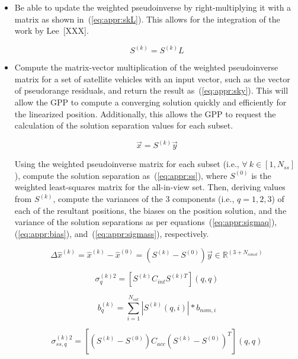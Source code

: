\documentclass[11pt]{article}
\begin{document}
\begin{itemize}
\item Be able to update the weighted pseudoinverse by right-multiplying it with a matrix as shown in~(\ref{eq:appr:skL}). This allows for the integration of the work by Lee~[XXX].

\begin{equation}
    \label{eq:appr:skL}
    S^{(k)} = S^{(k)} L
\end{equation}

\item Compute the matrix-vector multiplication of the weighted pseudoinverse matrix for a set of satellite vehicles with an input vector, such as the vector of pseudorange residuals, and return the result as~(\ref{eq:appr:sky}). This will allow the GPP to compute a converging solution quickly and efficiently for the linearized position. Additionally, this allows the GPP to request the calculation of the solution separation values for each subset.

\begin{equation}
    \label{eq:appr:sky}
    \vec{x} = S^{(k)} \vec{y}
\end{equation}

Using the weighted pseudoinverse matrix for each subset (i.e., $\forall \ k \in [1,N_{ss}]$), compute the solution separation as~(\ref{eq:appr:ss}), where $S^{(0)}$ is the weighted least-squares matrix for the all-in-view set. Then, deriving values from $S^{(k)}$, compute the variances of the 3 components (i.e., $q=1,2,3$) of each of the resultant positions, the biases on the position solution, and the variance of the solution separations as per equations~(\ref{eq:appr:sigmaq}), (\ref{eq:appr:bias}), and~(\ref{eq:appr:sigmass}), respectively.

\begin{equation}
    \label{eq:appr:ss}
    \Delta \hat{x}^{(k)} = \hat{x}^{(k)} - \hat{x}^{(0)} = (S^{(k)} - S^{(0)})\vec{y} \in \mathbb{R}^{(3+N_{const})}
\end{equation}

\begin{equation}
    \label{eq:appr:sigmaq}
    \sigma_q^{(k)2} = [S^{(k)}C_{int}S^{(k)T}](q,q)
\end{equation}

\begin{equation}
    \label{eq:appr:bias}
    b_q^{(k)} = \sum_{i=1}^{N_{sat}}|S^{(k)}(q,i)|*b_{nom,i}
\end{equation}

\begin{equation}
    \label{eq:appr:sigmass}
    \sigma_{ss,q}^{(k)2} = [(S^{(k)}-S^{(0)})C_{acc}(S^{(k)}-S^{(0)})^T](q,q)
\end{equation}

\end{itemize}
\end{document}

